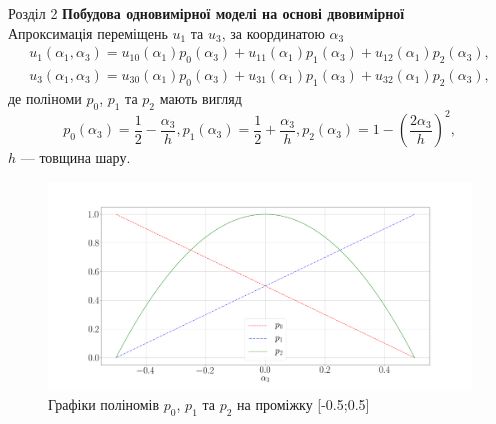 \documentclass[handout, 8pt]{beamer}
\numberwithin{figure}{section}
\numberwithin{equation}{section}
\numberwithin{table}{section}
\begin{document}
\begin{frame}{Розділ 2}
\textbf{Побудова одновимірної моделі на основі двовимірної}
\\
\vspace{1pt}
Апроксимація переміщень $u_1$ та $u_3$, за координатою $\alpha_3$ 
\begin{align}
u_1 \left( \alpha_1, \alpha_3 \right) = u_{10} \left( \alpha_1\right)p_0 \left( \alpha_3\right)+u_{11} \left( \alpha_1\right)p_1 \left( \alpha_3\right)+u_{12} \left( \alpha_1\right)p_2 \left( \alpha_3\right),\\
u_3 \left( \alpha_1, \alpha_3 \right) = u_{30} \left( \alpha_1\right)p_0 \left( \alpha_3\right)+u_{31} \left( \alpha_1\right)p_1 \left( \alpha_3\right)+u_{32} \left( \alpha_1\right)p_2 \left( \alpha_3\right),
\end{align}
де поліноми $p_0$, $p_1$ та $p_2$ мають вигляд
\begin{equation}
p_0 \left( \alpha_3\right) = \frac12-\frac{\alpha_3}{h},
p_1 \left( \alpha_3\right) = \frac12+\frac{\alpha_3}{h},
p_2 \left( \alpha_3\right) = 1-\left(\frac{2\alpha_3}{h}\right)^2,
\end{equation}
$h$ --- товщина шару.
\begin{figure}
\includegraphics[scale=0.1]{pic/polin.png}
\caption{Графіки поліномів $p_0$, $p_1$ та $p_2$ на проміжку [-0.5;0.5]}
\end{figure}

\end{frame}
\end{document}
